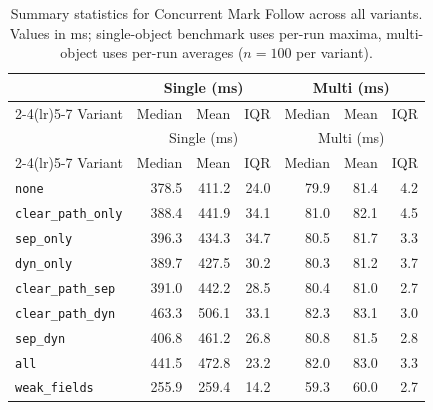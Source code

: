 \begin{longtable}[c]{l rrr rrr}
\caption[Concurrent Mark Follow summary statistics]{Summary statistics for Concurrent Mark Follow across all variants. Values in ms; single-object benchmark uses per-run maxima, multi-object uses per-run averages ($n=100$ per variant).}\label{tab:stats-markfollow} \\
\toprule
 & \multicolumn{3}{c}{Single (ms)} & \multicolumn{3}{c}{Multi (ms)} \\
\cmidrule(lr){2-4}\cmidrule(lr){5-7}
Variant & Median & Mean & IQR & Median & Mean & IQR \\
\midrule
\endfirsthead
\toprule
 & \multicolumn{3}{c}{Single (ms)} & \multicolumn{3}{c}{Multi (ms)} \\
\cmidrule(lr){2-4}\cmidrule(lr){5-7}
Variant & Median & Mean & IQR & Median & Mean & IQR \\
\midrule
\endhead
\bottomrule
\endfoot
\texttt{none} & 378.5 & 411.2 & 24.0 & 79.9 & 81.4 & 4.2 \\
\texttt{clear\_path\_only} & 388.4 & 441.9 & 34.1 & 81.0 & 82.1 & 4.5 \\
\texttt{sep\_only} & 396.3 & 434.3 & 34.7 & 80.5 & 81.7 & 3.3 \\
\texttt{dyn\_only} & 389.7 & 427.5 & 30.2 & 80.3 & 81.2 & 3.7 \\
\texttt{clear\_path\_sep} & 391.0 & 442.2 & 28.5 & 80.4 & 81.0 & 2.7 \\
\texttt{clear\_path\_dyn} & 463.3 & 506.1 & 33.1 & 82.3 & 83.1 & 3.0 \\
\texttt{sep\_dyn} & 406.8 & 461.2 & 26.8 & 80.8 & 81.5 & 2.8 \\
\texttt{all} & 441.5 & 472.8 & 23.2 & 82.0 & 83.0 & 3.3 \\
\texttt{weak\_fields} & 255.9 & 259.4 & 14.2 & 59.3 & 60.0 & 2.7 \\
\end{longtable}
